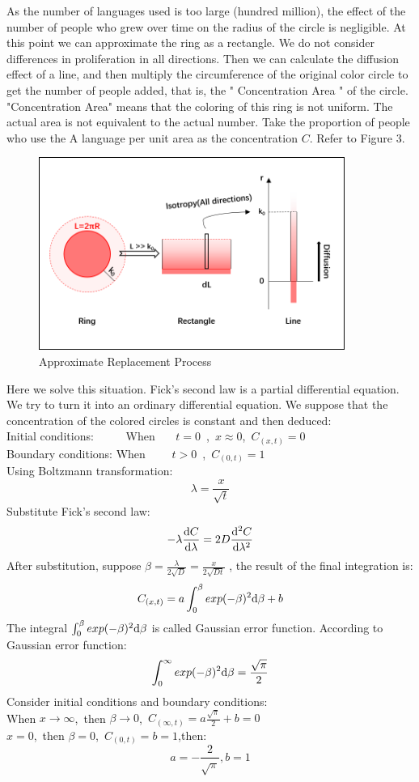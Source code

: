 \documentclass{mcmthesis}
\begin{document}
    As the number of languages used is too large (hundred million),
    the effect of the number of people who grew over time on the radius of the circle is negligible.
    At this point we can approximate the ring as a rectangle.
    We do not consider differences in proliferation in all directions.
    Then we can calculate the diffusion effect of a line,
    and then multiply the circumference of the original color circle
    to get the number of people added, that is, the " Concentration Area " of the circle.
    "Concentration Area" means that the coloring of this ring is not uniform.
    The actual area is not equivalent to the actual number.
    Take the proportion of people who use the A language per unit area as the concentration $C$.
    Refer to Figure 3.

      \begin{figure}[h]
        \centering
        \includegraphics[height=6.3cm,width=10cm]{p3.png}
        \caption{Approximate Replacement Process}
        \label{p3}
      \end{figure}

    Here we solve this situation.
    Fick's second law is a partial differential equation.
    We try to turn it into an ordinary differential equation.
    We suppose that the concentration of the colored circles is constant and then deduced:
    \\Initial conditions: \ \ \ \ \  When \ \ \ $t=0$\ ,\ $x\approx 0$,\ $C_{(x,t)}=0$
    \\Boundary conditions: When \ \ \ \ $t>0$\ ,\ $C_{(0,t)}=1$%
    \\Using Boltzmann transformation:
    $$\lambda=\frac{x}{\sqrt{t}}$$
    Substitute Fick's second law:
    $$-\lambda\frac{{\rm d}C}{{\rm d}\lambda}=2D\frac{{\rm d}^2C}{{\rm d}\lambda^2}$$
    After substitution, suppose $\beta=\frac{\lambda}{2\sqrt{D}}=\frac{x}{2\sqrt{Dt}}$ ,
    the result of the final integration is:
    $$C_{(x,t)}=a\int_0^\beta exp(-\beta)^2{\rm d}\beta+b$$
    The integral $\int_0^\beta exp(-\beta)^2{\rm d}\beta$ is called Gaussian error function.
    According to Gaussian error function:
    $$\int_0^\infty exp(-\beta)^2{\rm d}\beta=\frac{\sqrt{\pi}}{2}$$
    Consider initial conditions and boundary conditions:
    \\When $x\rightarrow\infty$,\ then $\beta\rightarrow 0$,\ $C_{(\infty,t)}=a\frac{\sqrt{\pi}}{2}+b=0$
    \\$x=0$,\ then $\beta=0$,\ $C_{(0,t)}=b=1$,then:
    $$a=-\frac{2}{\sqrt{\pi}},b=1$$
\end{document}
